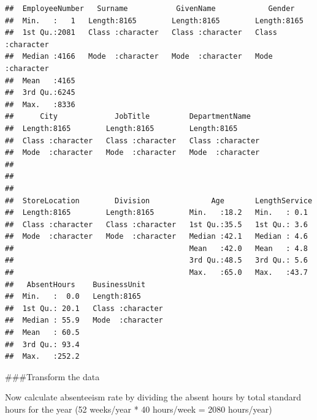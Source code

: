 \documentclass[12pt, krantz2,]{krantz}
\makeatletter
\newenvironment{Shaded}{\begin{snugshade}}{\end{snugshade}}
\newcommand{\DataTypeTok}[1]{\textcolor[rgb]{0.27,0.27,0.27}{#1}}
\newcommand{\DecValTok}[1]{\textcolor[rgb]{0.06,0.06,0.06}{#1}}
\newcommand{\KeywordTok}[1]{\textcolor[rgb]{0.27,0.27,0.27}{\textbf{#1}}}
\newcommand{\NormalTok}[1]{#1}
\newcommand{\OperatorTok}[1]{\textcolor[rgb]{0.43,0.43,0.43}{\textbf{#1}}}
\newcommand{\StringTok}[1]{\textcolor[rgb]{0.5,0.5,0.5}{#1}}
\newenvironment{kframe}{%
\medskip{}
\setlength{\fboxsep}{.8em}
 \def\at@end@of@kframe{}%
 \ifinner\ifhmode%
  \def\at@end@of@kframe{\end{minipage}}%
  \begin{minipage}{\columnwidth}%
 \fi\fi%
 \def\FrameCommand##1{\hskip\@totalleftmargin \hskip-\fboxsep
 \colorbox{shadecolor}{##1}\hskip-\fboxsep
     \hskip-\linewidth \hskip-\@totalleftmargin \hskip\columnwidth}%
 \MakeFramed {\advance\hsize-\width
   \@totalleftmargin\z@ \linewidth\hsize
   \@setminipage}}%
 {\par\unskip\endMakeFramed%
 \at@end@of@kframe}
\renewenvironment{Shaded}{\begin{kframe}}{\end{kframe}}
\makeatother
\begin{document}
\begin{verbatim}
##  EmployeeNumber   Surname           GivenName            Gender         
##  Min.   :   1   Length:8165        Length:8165        Length:8165       
##  1st Qu.:2081   Class :character   Class :character   Class :character  
##  Median :4166   Mode  :character   Mode  :character   Mode  :character  
##  Mean   :4165                                                           
##  3rd Qu.:6245                                                           
##  Max.   :8336                                                           
##      City             JobTitle         DepartmentName    
##  Length:8165        Length:8165        Length:8165       
##  Class :character   Class :character   Class :character  
##  Mode  :character   Mode  :character   Mode  :character  
##                                                          
##                                                          
##                                                          
##  StoreLocation        Division              Age       LengthService 
##  Length:8165        Length:8165        Min.   :18.2   Min.   : 0.1  
##  Class :character   Class :character   1st Qu.:35.5   1st Qu.: 3.6  
##  Mode  :character   Mode  :character   Median :42.1   Median : 4.6  
##                                        Mean   :42.0   Mean   : 4.8  
##                                        3rd Qu.:48.5   3rd Qu.: 5.6  
##                                        Max.   :65.0   Max.   :43.7  
##   AbsentHours    BusinessUnit      
##  Min.   :  0.0   Length:8165       
##  1st Qu.: 20.1   Class :character  
##  Median : 55.9   Mode  :character  
##  Mean   : 60.5                     
##  3rd Qu.: 93.4                     
##  Max.   :252.2
\end{verbatim}

\#\#\#Transform the data

Now calculate absenteeism rate by dividing the absent hours by total standard hours for the year (52 weeks/year * 40 hours/week = 2080 hours/year)

\begin{Shaded}
\end{Shaded}
\end{document}

